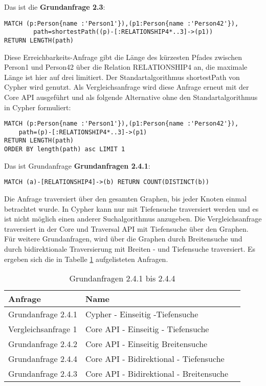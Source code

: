 \bigskip
\bigskip
\noindent Das ist die \textbf{Grundanfrage 2.3}: 
\begin{Verbatim}[frame=single]
MATCH (p:Person{name :'Person1'}),(p1:Person{name :'Person42'}),
		path=shortestPath((p)-[:RELATIONSHIP4*..3]->(p1)) 
RETURN LENGTH(path)
\end{Verbatim} 
Diese Erreichbarkeits-Anfrage gibt die Länge des kürzesten Pfades zwischen Person1 und Person42 über die Relation RELATIONSHIP4 an, die maximale Länge ist hier auf drei limitiert. Der Standartalgorithmus shortestPath von Cypher wird genutzt. Als Vergleichsanfrage wird diese Anfrage erneut mit der Core API ausgeführt und als folgende Alternative ohne den Standartalgorithmus in Cypher formuliert: 
\begin{Verbatim}[frame=single]
MATCH (p:Person{name :'Person1'}),(p1:Person{name :'Person42'}),
	path=(p)-[:RELATIONSHIP4*..3]->(p1) 
RETURN LENGTH(path)
ORDER BY length(path) asc LIMIT 1
\end{Verbatim}
 Das ist Grundanfrage \textbf{Grundanfragen 2.4.1}:
 \begin{Verbatim}[frame=single]
 MATCH (a)-[RELATIONSHIP4]->(b) RETURN COUNT(DISTINCT(b))
 \end{Verbatim}
Die Anfrage traversiert über den gesamten Graphen, bis jeder Knoten einmal betrachtet wurde. In Cypher kann nur mit Tiefensuche traversiert werden und es ist nicht möglich einen anderer Suchalgorithmus anzugeben. Die Vergleichsanfrage traversiert in der Core und Traversal API mit Tiefensuche über den Graphen. Für weitere Grundanfragen, wird über die Graphen durch  Breitensuche und durch bidirektionale Traversierung mit Breiten - und Tiefensuche traversiert. Es ergeben sich die in Tabelle \ref{tab:Intro_Query2_4} aufgelisteten Anfragen. 
\FloatBarrier
\begin{table}[h]
	\centering
	\begin{tabular}{ |p{5cm}||p{7cm}|p{3cm}  }
		\hline
		Anfrage& Name\\
		\hline
		Grundanfrage 2.4.1 &  Cypher - Einseitig -Tiefensuche\\
		Vergleichsanfrage 1 &  Core API - Einseitig - Tiefensuche \\
		Grundanfrage 2.4.2 &  Core API - Einseitig Breitensuche\\
		Grundanfrage 2.4.4 &  Core API -  Bidirektional - Tiefensuche\\
		Grundanfrage 2.4.3&  Core API - Bidirektional - Breitensuche\\
		\hline
	\end{tabular}
	\caption{Grundanfragen 2.4.1 bis 2.4.4}
	\label{tab:Intro_Query2_4}
\end{table}
\FloatBarrier
